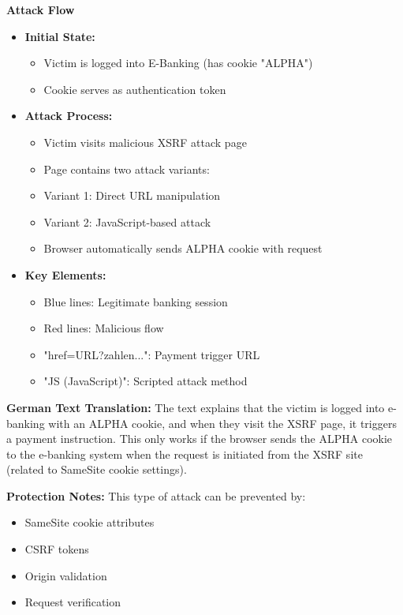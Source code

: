 \textbf{Attack Flow}
\begin{itemize}
    \item \textbf{Initial State:}
        \begin{itemize}
            \item Victim is logged into E-Banking (has cookie "ALPHA")
            \item Cookie serves as authentication token
        \end{itemize}
    
    \item \textbf{Attack Process:}
        \begin{itemize}
            \item Victim visits malicious XSRF attack page
            \item Page contains two attack variants:
            \item Variant 1: Direct URL manipulation
            \item Variant 2: JavaScript-based attack
            \item Browser automatically sends ALPHA cookie with request
        \end{itemize}

    \item \textbf{Key Elements:}
        \begin{itemize}
            \item Blue lines: Legitimate banking session
            \item Red lines: Malicious flow
            \item "href=URL?zahlen...": Payment trigger URL
            \item "JS (JavaScript)": Scripted attack method
        \end{itemize}
\end{itemize}

\textbf{German Text Translation:}
The text explains that the victim is logged into e-banking with an ALPHA cookie, and when they visit the XSRF page, it triggers a payment instruction. This only works if the browser sends the ALPHA cookie to the e-banking system when the request is initiated from the XSRF site (related to SameSite cookie settings).

\textbf{Protection Notes:}
This type of attack can be prevented by:
\begin{itemize}
    \item SameSite cookie attributes
    \item CSRF tokens
    \item Origin validation
    \item Request verification
\end{itemize}

